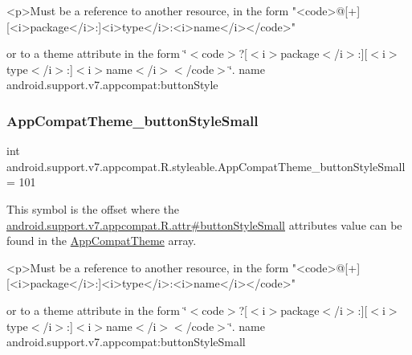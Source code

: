 \begin{DoxyVerb}      <p>Must be a reference to another resource, in the form "<code>@[+][<i>package</i>:]<i>type</i>:<i>name</i></code>"
\end{DoxyVerb}
 or to a theme attribute in the form \char`\"{}$<$code$>$?\mbox{[}$<$i$>$package$<$/i$>$\+:\mbox{]}\mbox{[}$<$i$>$type$<$/i$>$\+:\mbox{]}$<$i$>$name$<$/i$>$$<$/code$>$\char`\"{}.  name android.\+support.\+v7.\+appcompat\+:button\+Style \mbox{\label{classandroid_1_1support_1_1v7_1_1appcompat_1_1R_1_1styleable_a1cb9b470321310da072244cad16cbda3}} 
\subsubsection{\texorpdfstring{App\+Compat\+Theme\+\_\+button\+Style\+Small}{AppCompatTheme\_buttonStyleSmall}}
{\footnotesize\ttfamily int android.\+support.\+v7.\+appcompat.\+R.\+styleable.\+App\+Compat\+Theme\+\_\+button\+Style\+Small = 101\hspace{0.3cm}{\ttfamily [static]}}

This symbol is the offset where the \hyperlink{classandroid_1_1support_1_1v7_1_1appcompat_1_1R_1_1attr_ab141da798cf5a334c63def755033b611}{android.\+support.\+v7.\+appcompat.\+R.\+attr\#button\+Style\+Small} attribute\textquotesingle{}s value can be found in the \hyperlink{classandroid_1_1support_1_1v7_1_1appcompat_1_1R_1_1styleable_a5c42f89e8a410c323be34208d75c430b}{App\+Compat\+Theme} array.

\begin{DoxyVerb}      <p>Must be a reference to another resource, in the form "<code>@[+][<i>package</i>:]<i>type</i>:<i>name</i></code>"
\end{DoxyVerb}
 or to a theme attribute in the form \char`\"{}$<$code$>$?\mbox{[}$<$i$>$package$<$/i$>$\+:\mbox{]}\mbox{[}$<$i$>$type$<$/i$>$\+:\mbox{]}$<$i$>$name$<$/i$>$$<$/code$>$\char`\"{}.  name android.\+support.\+v7.\+appcompat\+:button\+Style\+Small \mbox{\label{classandroid_1_1support_1_1v7_1_1appcompat_1_1R_1_1styleable_af7ac616091affeb34fec71e5ee8b5c65}} 
